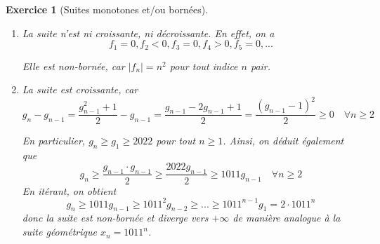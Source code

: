 \documentclass[11.5pt,french,table]{article}
\theoremstyle{exercice}
\newtheorem{exercice}{Exercice}
\begin{document}
\begin{exercice}[Suites monotones et/ou bornées]
\begin{enumerate}
    \item La suite n'est ni croissante, ni décroissante. En effet, on a $$f_1 = 0, f_2 < 0, f_3 = 0, f_4 > 0, f_5 = 0, ...$$
    
    Elle est non-bornée, car $|f_n| = n^2$ pour tout indice $n$ pair.
    
    \item[7.*] La suite est croissante, car 
    $$g_{n} - g_{n-1} =  \frac{g_{n-1}^2 + 1}{2} - g_{n-1} = \frac{g_{n-1} - 2g_{n-1} + 1}{2} = \frac{(g_{n-1}-1)^2}{2} \geq 0 \quad \forall n \geq 2$$
 
    En particulier, $g_n \geq g_1 \geq 2022$ pour tout $n \geq 1$. Ainsi, on déduit également que
    $$g_{n} \geq \frac{g_{n-1} \cdot g_{n-1}}{2} \geq \frac{2022 g_{n-1}}{2} \geq 1011 g_{n-1} \quad \forall n \geq 2$$
    En itérant, on obtient
    $$g_n \geq 1011 g_{n-1} \geq 1011^2 g_{n-2} \geq ... \geq 1011^{n-1}g_1 = 2\cdot 1011^n$$
    donc la suite est non-bornée et diverge vers $+\infty$ de manière analogue à la suite géométrique $x_n = 1011^n$.
\end{enumerate}
\end{exercice}
\end{document}
